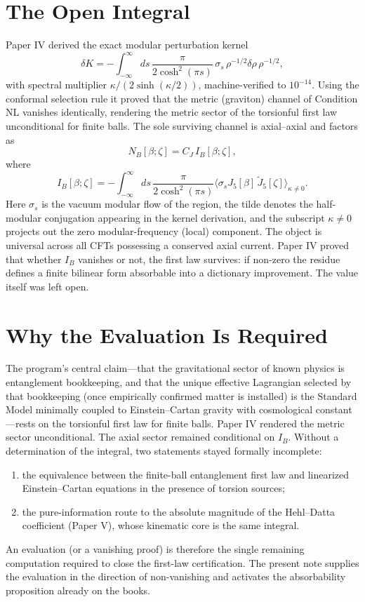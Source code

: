 \documentclass[11pt]{article}
\begin{document}
\section{The Open Integral}
Paper IV derived the exact modular perturbation kernel
\begin{equation}
\delta K = -\int_{-\infty}^{\infty} ds\,
\frac{\pi}{2\cosh^{2}(\pi s)}\,
\sigma_s\,\rho^{-1/2}\delta\rho\,\rho^{-1/2},
\end{equation}
with spectral multiplier $\kappa/(2\sinh(\kappa/2))$, machine-verified to
$10^{-14}$. Using the conformal selection rule it proved that the metric
(graviton) channel of Condition NL vanishes identically, rendering the
metric sector of the torsionful first law unconditional for finite balls.
The sole surviving channel is axial--axial and factors as
\begin{equation}
N_B[\beta;\zeta] = C_J\, I_B[\beta;\zeta],
\end{equation}
where
\begin{equation}
I_B[\beta;\zeta]
=
-\int_{-\infty}^{\infty} ds\,
\frac{\pi}{2\cosh^{2}(\pi s)}
\bigl\langle
\sigma_s J_5[\beta]\,
\widetilde{J}_5[\zeta]
\bigr\rangle_{\kappa\neq 0}.
\end{equation}
Here $\sigma_s$ is the vacuum modular flow of the region, the tilde
denotes the half-modular conjugation appearing in the kernel derivation,
and the subscript $\kappa\neq 0$ projects out the zero modular-frequency
(local) component. The object is universal across all CFTs possessing a
conserved axial current. Paper IV proved that whether $I_B$ vanishes or
not, the first law survives: if non-zero the residue defines a finite
bilinear form absorbable into a dictionary improvement. The value itself
was left open.

\section{Why the Evaluation Is Required}
The program's central claim---that the gravitational sector of known
physics is entanglement bookkeeping, and that the unique effective
Lagrangian selected by that bookkeeping (once empirically confirmed
matter is installed) is the Standard Model minimally coupled to
Einstein--Cartan gravity with cosmological constant---rests on the
torsionful first law for finite balls. Paper IV rendered the metric
sector unconditional. The axial sector remained conditional on $I_B$.
Without a determination of the integral, two statements stayed formally
incomplete:
\begin{enumerate}[leftmargin=1.6em]
\item the equivalence between the finite-ball entanglement first law and
linearized Einstein--Cartan equations in the presence of torsion sources;
\item the pure-information route to the absolute magnitude of the
Hehl--Datta coefficient (Paper V), whose kinematic core is the same
integral.
\end{enumerate}
An evaluation (or a vanishing proof) is therefore the single remaining
computation required to close the first-law certification. The present
note supplies the evaluation in the direction of non-vanishing and
activates the absorbability proposition already on the books.
\end{document}
